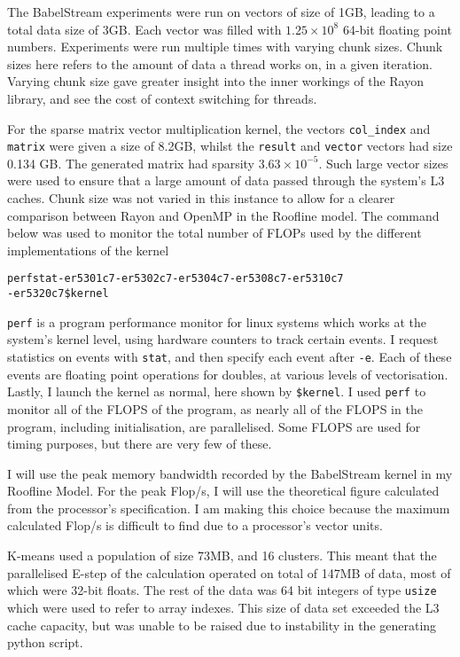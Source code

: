 The BabelStream experiments were run on vectors of size of 1GB, leading to a total data size of 3GB\@. Each vector was filled with $1.25\times10^8$ 64-bit floating point numbers. Experiments were run multiple times with varying chunk sizes. Chunk sizes here refers to the amount of data a thread works on, in a given iteration. Varying chunk size gave greater insight into the inner workings of the Rayon library, and see the cost of context switching for threads.

For the sparse matrix vector multiplication kernel, the vectors \texttt{col\_index} and \texttt{matrix} were given a size of 8.2GB, whilst the \texttt{result} and \texttt{vector} vectors had size 0.134 GB\@. The generated matrix had sparsity $3.63 \times 10^{-5}$. Such large vector sizes were used to ensure that a large amount of data passed through the system's L3 caches. Chunk size was not varied in this instance to allow for a clearer comparison between Rayon and OpenMP in the Roofline model. The command below was used to monitor the total number of FLOPs used by the different implementations of the kernel

\begin{alltt}
\footnotesize
perf stat -e r5301c7 -e r5302c7 -e r5304c7 -e r5308c7 -e r5310c7 
          -e r5320c7 \$kernel 
\end{alltt}

\texttt{perf} is a program performance monitor for linux systems which works at the system's kernel level, using hardware counters to track certain events. I request statistics on events with \texttt{stat}, and then specify each event after \texttt{-e}. Each of these events are floating point operations for doubles, at various levels of vectorisation. Lastly, I launch the kernel as normal, here shown by \texttt{\$kernel}.
I used \texttt{perf} to monitor all of the FLOPS of the program, as nearly all of the FLOPS in the program, including initialisation, are parallelised. Some FLOPS are used for timing purposes, but there are very few of these.

I will use the peak memory bandwidth recorded by the BabelStream kernel in my Roofline Model. For the peak Flop/s, I will use the theoretical figure calculated from the processor's specification. I am making this choice because the maximum calculated Flop/s is difficult to find due to a processor's vector units.

K-means used a population of size 73MB, and 16 clusters. This meant that the parallelised E-step of the calculation operated on total of 147MB of data, most of which were 32-bit floats. The rest of the data was 64 bit integers of type \texttt{usize} which were used to refer to array indexes. This size of data set exceeded the L3 cache capacity, but was unable to be raised due to instability in the generating python script.

